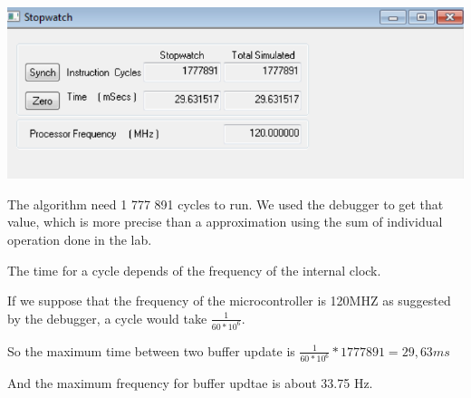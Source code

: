 \documentclass[a4paper]{article}
\begin{document}
\begin{center}
\includegraphics[scale=0.5]{files/stopwatch.png} 
\end{center}

The algorithm need 1 777 891 cycles to run. We used the debugger to get that value, which is more precise than a approximation using the sum of individual operation done in the lab.

The time for a cycle depends of the frequency of the internal clock.

If we suppose that the frequency of the microcontroller is 120MHZ as suggested by the debugger, a cycle would take $ \frac{1}{60 * 10^{6} }$.

So the maximum time between two buffer update is $ \frac{1}{60 * 10^{6} } * 1 777 891 =  29,63 ms $

And the maximum frequency for buffer updtae is about 33.75 Hz. 
\end{document}

